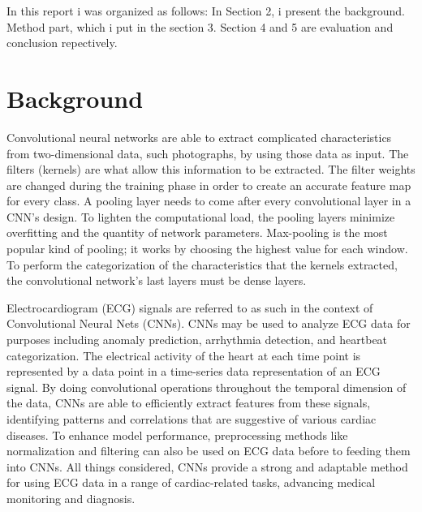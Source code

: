 \documentclass{article}
\begin{document}
\begin{multicols}{2}
In this report i was organized as follows: In Section 2, i present the background. Method part, which i put in the section 3. Section 4 and 5 are evaluation and conclusion repectively.



\section{Background}

Convolutional neural networks are able to extract complicated characteristics from two-dimensional data, such photographs, by using those data as input. The filters (kernels) are what allow this information to be extracted. The filter weights are changed during the training phase in order to create an accurate feature map for every class.
A pooling layer needs to come after every convolutional layer in a CNN's design. To lighten the computational load, the pooling layers minimize overfitting and the quantity of network parameters. Max-pooling is the most popular kind of pooling; it works by choosing the highest value for each window. To perform the categorization of the characteristics that the kernels extracted, the convolutional network's last layers must be dense layers. 

Electrocardiogram (ECG) signals are referred to as such in the context of Convolutional Neural Nets (CNNs). CNNs may be used to analyze ECG data for purposes including anomaly prediction, arrhythmia detection, and heartbeat categorization. The electrical activity of the heart at each time point is represented by a data point in a time-series data representation of an ECG signal. By doing convolutional operations throughout the temporal dimension of the data, CNNs are able to efficiently extract features from these signals, identifying patterns and correlations that are suggestive of various cardiac diseases. To enhance model performance, preprocessing methods like normalization and filtering can also be used on ECG data before to feeding them into CNNs. All things considered, CNNs provide a strong and adaptable method for using ECG data in a range of cardiac-related tasks, advancing medical monitoring and diagnosis.


\end{multicols}
\end{document}
